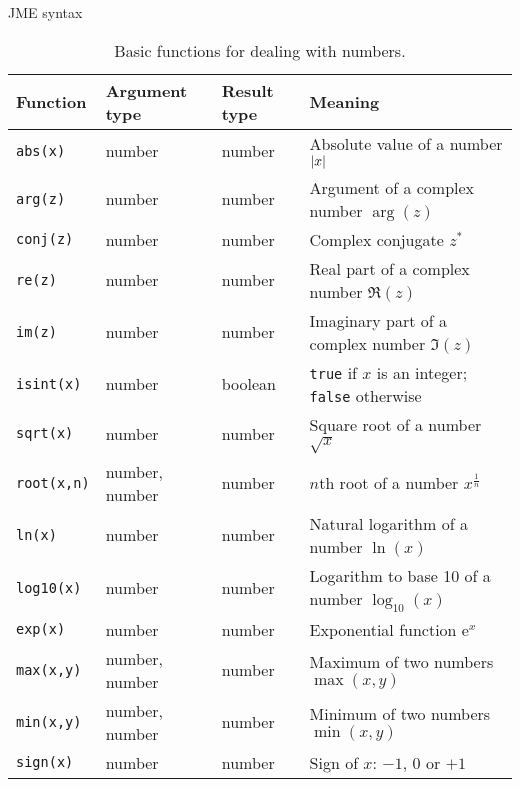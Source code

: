 \begin{chapter}{\label{cha:jme_syntax}JME syntax}
  \begin{sidewaystable}[ht]
  	\centering
  	\begin{tabular}{llll}
  		\hline
  		Function & Argument type & Result type & Meaning \\
  		\hline
      \verb"abs(x)" & number & number & Absolute value of a number $\lvert x\rvert$ \\
      \verb"arg(z)"	& number & number	& Argument of a complex number $\arg{(z)}$ \\
      \verb"conj(z)" & number & number & Complex conjugate $z^{*}$ \\
      \verb"re(z)" & number & number & Real part of a complex number $\Re{(z)}$ \\
  		\verb"im(z)" & number & number & Imaginary part of a complex number
      $\Im{(z)}$ \\
      \verb"isint(x)"	& number & boolean & \verb"true" if $x$ is an
      integer; \verb"false" otherwise \\
      \verb"sqrt(x)" & number & number & Square root of a number $\sqrt{x}$ \\
      \verb"root(x,n)" & number, number & number & $n$th root of a number $x^{\frac{1}{n}}$ \\
      \verb"ln(x)" & number & number & Natural logarithm of a number $\ln{(x)}$ \\
      \verb"log10(x)" & number & number	& Logarithm to base 10 of a number $\log_{10}{(x)}$ \\
      \verb"exp(x)" & number & number & Exponential function $\mathrm{e}^{x}$
      \\
      \verb"max(x,y)" & number, number & number & Maximum of two numbers $\max{(x,y)}$ \\
      \verb"min(x,y)"	& number, number & number & Minimum of two numbers $\min{(x,y)}$ \\
      \verb"sign(x)" & number & number & Sign of $x$: $-1$, $0$ or $+1$ \\
      \hline\hline
  	\end{tabular}
  	\caption{\label{tab:numberfunctions}
  		Basic functions for dealing with numbers.
  	}
  \end{sidewaystable}
  

\end{chapter}
